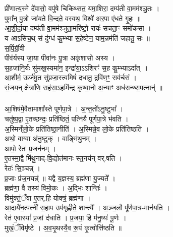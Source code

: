 \section{}
\subsubsection{}
प्री॑णात्य॒स्मे दे॑वासो॒ वपु॑षे चिकिथ्सत॒ यमा॒शिरा॒ दम्प॑ती वा॒मम॑श्ञु॒तः ।\\
पुमा᳚न् पु॒त्रो जा॑यते वि॒न्दते॒ वस्वथ॒ विश्वे॑ अर॒पा ए॑धते गृ॒हः ॥\\
आ॒शी॒र्दा॒या दम्प॑ती वा॒मम॑श्ञुता॒मरि॑ष्टो॒ रायः॑ सचता॒ꣳ॒ समो॑कसा ।\\
य आऽसि॑च॒थ् सं दु॑ग्धं कु॒म्भ्या स॒हेष्टेन॒ याम॒न्नम॑तिं जहातु॒ सः ॥\\
स॒र्पि॒र्ग्री॒वी\\
पीव॑र्यस्य जा॒या पीवा॑नः पु॒त्रा अकृ॑शासो अस्य ।\\
स॒हजा॑नि॒र्यः सु॑मख॒स्यमा॑न॒ इन्द्रा॑या॒ऽऽशिरꣳ॑ स॒ह कु॒म्भ्याऽदा᳚त् ॥\\
आ॒शीर्म॒ ऊर्ज॑मु॒त सु॑प्रजा॒स्त्वमिषं॑ दधातु॒ द्रवि॑ण॒ꣳ॒ सव॑र्चसं ।\\
सं॒जय॒न् क्षेत्रा॑णि॒ सह॑सा॒ऽहमि॑न्द्र कृण्वा॒नो अ॒न्याꣳ अध॑रान्थ्स॒पत्नान्॑ ॥\\
\subsubsection{}
आ॒शिष॑मे॒वैतामाशा᳚स्ते पूर्णपा॒त्रे । अ॒न्त॒तो॑ऽनु॒ष्टुभा᳚ ।\\
चतु॑ष्प॒द्वा ए॒तच्छन्दः॒ प्रति॑ष्ठितं॒ पत्नि॑यै पूर्णपा॒त्रे भ॑वति ।\\
अ॒स्मिन्ँलो॒के प्रति॑तिष्ठा॒नीति॑ । अ॒स्मिन्ने॒व लो॒के प्रति॑तिष्ठति ।\\
अथो॒ वाग्वा अ॑नु॒ष्टुक् । वाङ्मि॑थु॒नम् ।\\
आपो॒ रेतः॑ प्र॒जन॑नम् ।\\
ए॒तस्मा॒द्वै मि॑थु॒नाद्-वि॒द्योत॑मानः स्त॒नय॑न् वर्.षति ।\\
रेतः॑ सि॒ञ्चन्न् ।\\
प्र॒जाः प्र॑ज॒नयन्न्॑ ॥ यद्वै य॒ज्ञस्य॒ ब्रह्म॑णा यु॒ज्यते᳚ ।\\
ब्रह्म॑णा॒ वै तस्य॑ विमो॒कः । अ॒द्भिः शान्तिः॑ ।\\
विमु॑क्तं॒ँवा ए॒तर्.हि॒ योक्त्रं॒ ब्रह्म॑णा ।\\
आ॒दायै॑न॒त्पत्नी॑ स॒हाप उप॑गृह्णीते॒ शान्त्यै᳚ । अ॒ञ्ज॒लौ पू᳚र्णपा॒त्र-मान॑यति ।\\
रेत॑ ए॒वास्यां᳚ प्र॒जां द॑धाति । प्र॒जया॒ हि म॑नु॒ष्यः॑ पू॒र्णः ।\\
मुखं॒ँविमृ॑ष्टे । अ॒व॒भृ॒थस्यै॒व रू॒पं कृ॒त्वोत्ति॑ष्ठति ॥\\
